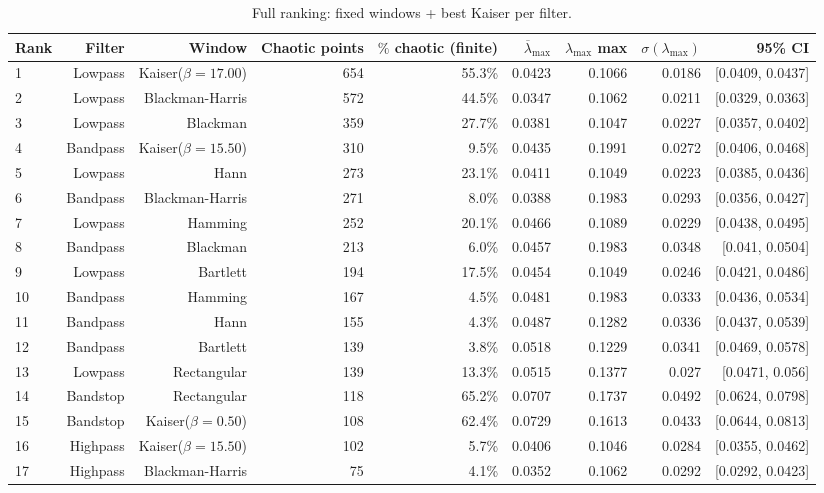   \begin{longtable}{lrrrrrrrr}
    \caption{Full ranking: fixed windows + best Kaiser per filter.} \\
    \toprule
    Rank & Filter & Window & Chaotic points & $\%$ chaotic (finite) & $\overline{\lambda}_{\max}$ & $\lambda_{\max}$ max & $\sigma(\lambda_{\max})$ & 95\% CI \\
    \midrule
    1 & Lowpass & Kaiser($\beta=17.00$) & 654 & 55.3\% & 0.0423 & 0.1066 & 0.0186 & [0.0409, 0.0437] \\
    2 & Lowpass & Blackman-Harris & 572 & 44.5\% & 0.0347 & 0.1062 & 0.0211 & [0.0329, 0.0363] \\
    3 & Lowpass & Blackman & 359 & 27.7\% & 0.0381 & 0.1047 & 0.0227 & [0.0357, 0.0402] \\
    4 & Bandpass & Kaiser($\beta=15.50$) & 310 & 9.5\% & 0.0435 & 0.1991 & 0.0272 & [0.0406, 0.0468] \\
    5 & Lowpass & Hann & 273 & 23.1\% & 0.0411 & 0.1049 & 0.0223 & [0.0385, 0.0436] \\
    6 & Bandpass & Blackman-Harris & 271 & 8.0\% & 0.0388 & 0.1983 & 0.0293 & [0.0356, 0.0427] \\
    7 & Lowpass & Hamming & 252 & 20.1\% & 0.0466 & 0.1089 & 0.0229 & [0.0438, 0.0495] \\
    8 & Bandpass & Blackman & 213 & 6.0\% & 0.0457 & 0.1983 & 0.0348 & [0.041, 0.0504] \\
    9 & Lowpass & Bartlett & 194 & 17.5\% & 0.0454 & 0.1049 & 0.0246 & [0.0421, 0.0486] \\
    10 & Bandpass & Hamming & 167 & 4.5\% & 0.0481 & 0.1983 & 0.0333 & [0.0436, 0.0534] \\
    11 & Bandpass & Hann & 155 & 4.3\% & 0.0487 & 0.1282 & 0.0336 & [0.0437, 0.0539] \\
    12 & Bandpass & Bartlett & 139 & 3.8\% & 0.0518 & 0.1229 & 0.0341 & [0.0469, 0.0578] \\
    13 & Lowpass & Rectangular & 139 & 13.3\% & 0.0515 & 0.1377 & 0.027 & [0.0471, 0.056] \\
    14 & Bandstop & Rectangular & 118 & 65.2\% & 0.0707 & 0.1737 & 0.0492 & [0.0624, 0.0798] \\
    15 & Bandstop & Kaiser($\beta=0.50$) & 108 & 62.4\% & 0.0729 & 0.1613 & 0.0433 & [0.0644, 0.0813] \\
    16 & Highpass & Kaiser($\beta=15.50$) & 102 & 5.7\% & 0.0406 & 0.1046 & 0.0284 & [0.0355, 0.0462] \\
    17 & Highpass & Blackman-Harris & 75 & 4.1\% & 0.0352 & 0.1062 & 0.0292 & [0.0292, 0.0423] \\

\end{longtable}

